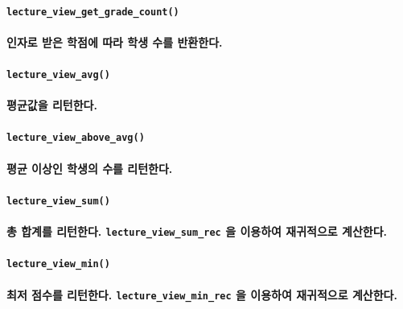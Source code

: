 \documentclass[UTF8]{report}
\begin{document}
            \paragraph{\texttt{lecture\_view\_get\_grade\_count()}}
            \paragraph{%
                \normalfont  인자로 받은 학점에 따라 학생 수를 반환한다.
            }

            \paragraph{\texttt{lecture\_view\_avg()}}
            \paragraph{%
                \normalfont 평균값을 리턴한다. 
            }

            \paragraph{\texttt{lecture\_view\_above\_avg()}}
            \paragraph{%
                \normalfont 평균 이상인 학생의 수를 리턴한다.
            }

            \paragraph{\texttt{lecture\_view\_sum()}}
            \paragraph{%
                \normalfont 총 합계를 리턴한다. \texttt{lecture\_view\_sum\_rec} 을 이용하여 재귀적으로 계산한다.
            }

            \paragraph{\texttt{lecture\_view\_min()}}
            \paragraph{%
                \normalfont 최저 점수를 리턴한다. \texttt{lecture\_view\_min\_rec} 을 이용하여 재귀적으로 계산한다.
            }
\end{document}
